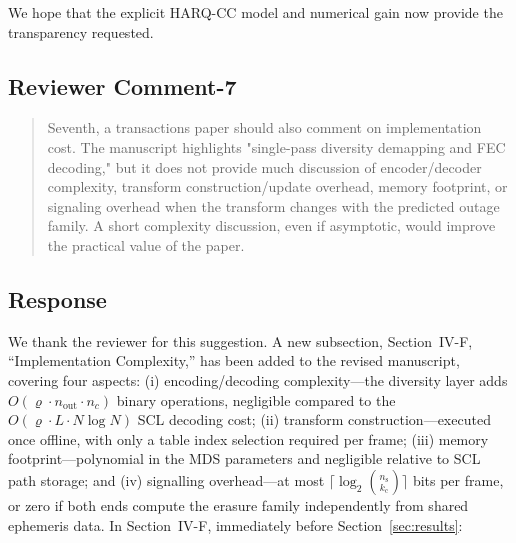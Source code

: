 We hope that the explicit HARQ-CC model and numerical gain now provide the transparency requested.


\subsection{Reviewer Comment-7}



\begin{mdframed}
\begin{quote}
Seventh, a transactions paper should also comment on implementation cost. The manuscript highlights "single-pass diversity demapping and FEC decoding," but it does not provide much discussion of encoder/decoder complexity, transform construction/update overhead, memory footprint, or signaling overhead when the transform changes with the predicted outage family. A short complexity discussion, even if asymptotic, would improve the practical value of the paper.

\end{quote}

\end{mdframed}


\subsection{Response}

We thank the reviewer for this suggestion. A new subsection, Section~IV-F, ``Implementation Complexity,'' has been added to the revised manuscript, covering four aspects: (i) encoding/decoding complexity---the diversity layer adds $O(\varrho \cdot n_{\mathrm{out}} \cdot n_c)$ binary operations, negligible compared to the $O(\varrho \cdot L \cdot N \log N)$ SCL decoding cost; (ii) transform construction---executed once offline, with only a table index selection required per frame; (iii) memory footprint---polynomial in the MDS parameters and negligible relative to SCL path storage; and (iv) signalling overhead---at most $\lceil\log_2\binom{n_{\mathrm{s}}}{k_{\mathrm{c}}}\rceil$ bits per frame, or zero if both ends compute the erasure family independently from shared ephemeris data. In Section~IV-F, immediately before Section~\ref{sec:results}:

